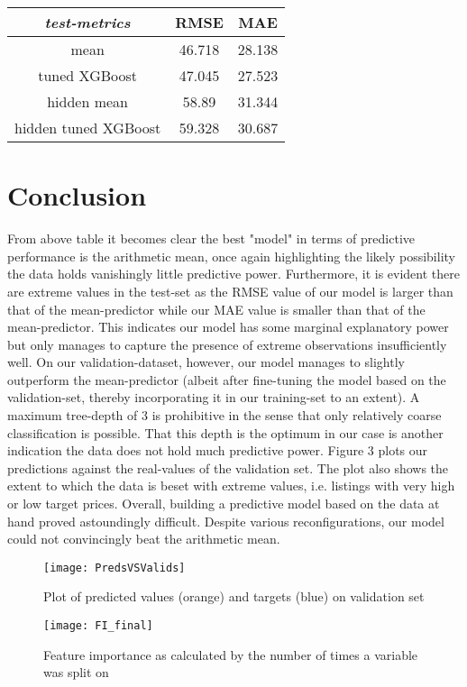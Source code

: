 \documentclass[11pt, oneside]{article}   	%
\begin{document}
\begin{center}
\begin{tabular}{c | c c}
\textit{test-metrics}&RMSE&MAE \\
\hline
mean&46.718&28.138\\
tuned XGBoost&47.045&27.523\\
hidden mean&58.89&31.344\\
hidden tuned XGBoost&59.328&30.687
\end{tabular}
\end{center}
\section{Conclusion}
From above table it becomes clear the best "model" in terms of predictive performance is the arithmetic mean, once again highlighting the likely possibility the data holds vanishingly little predictive power.
\newline
\indent Furthermore, it is evident there are extreme values in the test-set as the RMSE value of our model is larger than that of the mean-predictor while our MAE value is smaller than that of the mean-predictor. This indicates our model has some marginal explanatory power but only manages to capture the presence of extreme observations insufficiently well. On our validation-dataset, however, our model manages to slightly outperform the mean-predictor (albeit after fine-tuning the model based on the validation-set, thereby incorporating it in our training-set to an extent).\newline
\indent A maximum tree-depth of 3 is prohibitive in the sense that only relatively coarse classification is possible. That this depth is the optimum in our case is another indication the data does not hold much predictive power. Figure 3 plots our predictions against the real-values of the validation set. The plot also shows the extent to which the data is beset with extreme values, i.e. listings with very high or low target prices.\newline
Overall, building a predictive model based on the data at hand proved astoundingly difficult. Despite various reconfigurations, our model could not convincingly beat the arithmetic mean.




\begin{figure}[h]

\centering
	\texttt{[image: PredsVSValids]}
\caption{Plot of predicted values (orange) and targets (blue) on validation set}
\label{figure label}
\end{figure}

\begin{figure}[h!]
\centering
	\texttt{[image: FI\_final]}
\caption{Feature importance as calculated by the number of times a variable was split on}
\label{figure label}

\end{figure}
\end{document}
